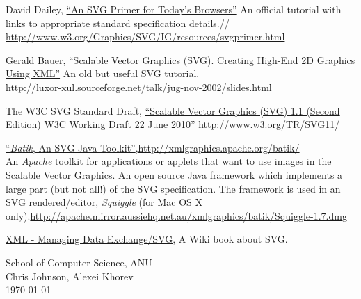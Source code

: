 \documentclass[a4paper]{article}
\begin{document}
\bigskip
\begin{thebibliography}{999}

 David Dailey, 
\href{http://www.w3.org/Graphics/SVG/IG/resources/svgprimer.html}{``An SVG Primer for Today's Browsers''}
An official tutorial with links to appropriate standard specification
details.//
\href{http://www.w3.org/Graphics/SVG/IG/resources/svgprimer.html}{http://www.w3.org/Graphics/SVG/IG/resources/svgprimer.html}

 Gerald Bauer,
\href{http://luxor-xul.sourceforge.net/talk/jug-nov-2002/slides.html}{``Scalable Vector Graphics (SVG).
Creating High-End 2D Graphics Using XML''} An old but useful SVG
tutorial.\\
\href{http://luxor-xul.sourceforge.net/talk/jug-nov-2002/slides.html}{http://luxor-xul.sourceforge.net/talk/jug-nov-2002/slides.html}

 The W3C SVG Standard Draft, \href{http://www.w3.org/TR/SVG11/}{``Scalable 
Vector Graphics (SVG) 1.1 (Second Edition) W3C Working Draft 22 June 2010''} \href{http://www.w3.org/TR/SVG11/}{http://www.w3.org/TR/SVG11/}

 \href{http://xmlgraphics.apache.org/batik/}{``\emph{Batik}, An SVG Java Toolkit''},\href{http://xmlgraphics.apache.org/batik/}{http://xmlgraphics.apache.org/batik/}\\
An \emph{Apache} toolkit for applications or applets that want to use images in the Scalable Vector
Graphics. An open source Java framework which implements a large part (but not all!) of the 
SVG specification. The framework is used in an SVG rendered/editor,
\href{http://apache.mirror.aussiehq.net.au/xmlgraphics/batik/Squiggle-1.7.dmg}{\emph{Squiggle}}
(for Mac OS X only).\href{http://apache.mirror.aussiehq.net.au/xmlgraphics/batik/Squiggle-1.7.dmg}{http://apache.mirror.aussiehq.net.au/xmlgraphics/batik/Squiggle-1.7.dmg}

\href{http://en.wikibooks.org/wiki/XML_-_Managing_Data_Exchange/SVG}%
{XML - Managing Data Exchange/SVG}, A Wiki book about SVG.\\


\end{thebibliography}
\vfill

\begin{flushright}
{%
\fontsize{13pt}{14pt}\selectfont 
School of Computer Science, ANU \\
Chris Johnson, Alexei Khorev \\ 
\today\space }
\end{flushright}
\end{document}
